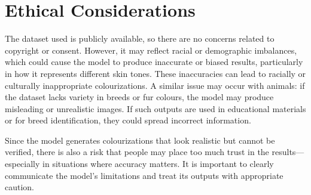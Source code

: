 \documentclass{article} %
\begin{document}
\section{Ethical Considerations}
\label{ethical}

The dataset used is publicly available, so there are no concerns related to copyright or consent. However, it may reflect racial or demographic imbalances, which could cause the model 
to produce inaccurate or biased results, particularly in how it represents different skin tones. These inaccuracies can lead to racially or culturally inappropriate colourizations. A 
similar issue may occur with animals: if the dataset lacks variety in breeds or fur colours, the model may produce misleading or unrealistic images. If such outputs are used in educational 
materials or for breed identification, they could spread incorrect information.

Since the model generates colourizations that look realistic but cannot be verified, there is also a risk that people may place too much trust in the results—especially in situations 
where accuracy matters. It is important to clearly communicate the model's limitations and treat its outputs with appropriate caution.

\label{last_page}

\newpage


\end{document}
